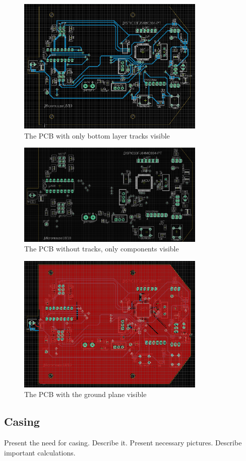 \begin{figure}[htb]
    \centering
    \includegraphics[width=0.8\textwidth]{figures/hardware/PCB_Bottom.PNG}
    \caption{The PCB with only bottom layer tracks visible}
    \label{fig:bottom}
\end{figure}

\begin{figure}[htb]
    \centering
    \includegraphics[width=0.8\textwidth]{figures/hardware/PCB_Components.PNG}
    \caption{The PCB without tracks, only components visible}
    \label{fig:comp}
\end{figure}

\begin{figure}[htb]
    \centering
    \includegraphics[width=0.8\textwidth]{figures/hardware/PCB_Grounded.PNG}
    \caption{The PCB with the ground plane visible}
    \label{fig:gnd}
\end{figure}

\FloatBarrier

\subsection{Casing}

Present the need for casing.
Describe it.
Present necessary pictures.
Describe important calculations.






